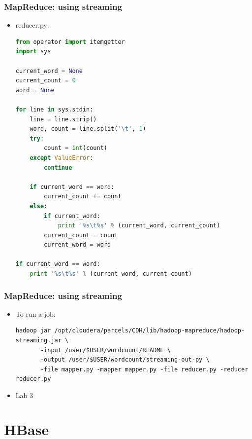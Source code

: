 \documentclass{beamer}
\begin{document}
\begin{frame}[fragile]
 \frametitle{MapReduce: using streaming}
\begin{itemize}
  \item {\color{mycolorcli}reducer.py}:
{\color{mycolorcode}
  \begin{lstlisting}[frame=single, basicstyle=\tiny,language=python]
from operator import itemgetter
import sys

current_word = None
current_count = 0
word = None

for line in sys.stdin: 
    line = line.strip()
    word, count = line.split('\t', 1)
    try:
        count = int(count)
    except ValueError:
        continue

    if current_word == word:
        current_count += count
    else:
        if current_word:
            print '%s\t%s' % (current_word, current_count)
        current_count = count
        current_word = word

if current_word == word:
    print '%s\t%s' % (current_word, current_count)
 \end{lstlisting}
}
\end{itemize}
\end{frame}

\begin{frame}[fragile]
 \frametitle{MapReduce: using streaming}

 \begin{itemize}
   \item To run a job:
{\color{mycolorcli}
  \begin{lstlisting}[frame=single, basicstyle=\tiny]
hadoop jar /opt/cloudera/parcels/CDH/lib/hadoop-mapreduce/hadoop-streaming.jar \ 
       -input /user/$USER/wordcount/README \
       -output /user/$USER/wordcount/streaming-out-py \ 
       -file mapper.py -mapper mapper.py -file reducer.py -reducer reducer.py
 \end{lstlisting}
}

\item Lab 3

 \end{itemize}


\end{frame}

\section{HBase}
\end{document}
